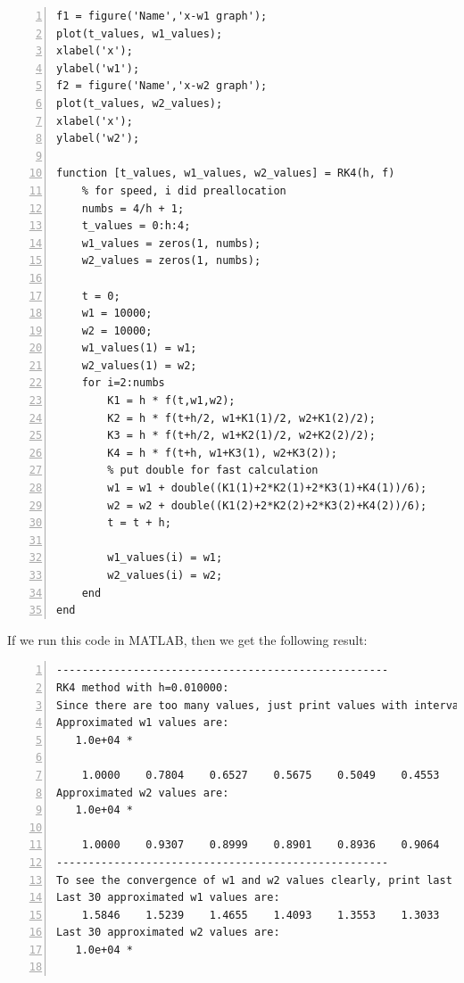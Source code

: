 \documentclass{article}
\begin{document}
\begin{enumerate}
\begin{lstlisting}[frame=single, numbers=left, style=Matlab-editor]
f1 = figure('Name','x-w1 graph');
plot(t_values, w1_values);
xlabel('x');
ylabel('w1');
f2 = figure('Name','x-w2 graph');
plot(t_values, w2_values);
xlabel('x');
ylabel('w2');

function [t_values, w1_values, w2_values] = RK4(h, f)
    % for speed, i did preallocation
    numbs = 4/h + 1;
    t_values = 0:h:4;
    w1_values = zeros(1, numbs);
    w2_values = zeros(1, numbs);

    t = 0;
    w1 = 10000;
    w2 = 10000;
    w1_values(1) = w1;
    w2_values(1) = w2;
    for i=2:numbs
        K1 = h * f(t,w1,w2);
        K2 = h * f(t+h/2, w1+K1(1)/2, w2+K1(2)/2);
        K3 = h * f(t+h/2, w1+K2(1)/2, w2+K2(2)/2);
        K4 = h * f(t+h, w1+K3(1), w2+K3(2));
        % put double for fast calculation
        w1 = w1 + double((K1(1)+2*K2(1)+2*K3(1)+K4(1))/6);
        w2 = w2 + double((K1(2)+2*K2(2)+2*K3(2)+K4(2))/6);
        t = t + h;

        w1_values(i) = w1;
        w2_values(i) = w2;
    end
end
    \end{lstlisting} If we run this code in MATLAB, then we get the following result: \begin{lstlisting}[frame=single, numbers=left, style=Matlab-editor]
----------------------------------------------------
RK4 method with h=0.010000:
Since there are too many values, just print values with interval length 1/10, i.e., only print it once every 10 times
Approximated w1 values are:
   1.0e+04 *

    1.0000    0.7804    0.6527    0.5675    0.5049    0.4553    0.4134    0.3764    0.3425    0.3106    0.2802    0.2509    0.2227    0.1956    0.1698    0.1454    0.1228    0.1021    0.0836    0.0673    0.0532    0.0414    0.0317    0.0239    0.0178    0.0130    0.0094    0.0068    0.0048    0.0034    0.0023    0.0016    0.0011    0.0008    0.0005    0.0004    0.0002    0.0002    0.0001    0.0001    0.0001
Approximated w2 values are:
   1.0e+04 *

    1.0000    0.9307    0.8999    0.8901    0.8936    0.9064    0.9263    0.9518    0.9823    1.0171    1.0557    1.0980    1.1435    1.1919    1.2427    1.2955    1.3497    1.4045    1.4593    1.5133    1.5657    1.6157    1.6629    1.7066    1.7466    1.7827    1.8148    1.8431    1.8677    1.8890    1.9072    1.9227    1.9358    1.9468    1.9560    1.9637    1.9701    1.9754    1.9797    1.9833    1.9863
----------------------------------------------------
To see the convergence of w1 and w2 values clearly, print last 30 values
Last 30 approximated w1 values are:
    1.5846    1.5239    1.4655    1.4093    1.3553    1.3033    1.2533    1.2052    1.1589    1.1143    1.0715    1.0303    0.9907    0.9525    0.9159    0.8806    0.8467    0.8140    0.7826    0.7525    0.7234    0.6955    0.6687    0.6428    0.6180    0.5941    0.5712    0.5491    0.5279    0.5074
Last 30 approximated w2 values are:
   1.0e+04 *


\end{lstlisting}
\end{enumerate}
\end{document}
